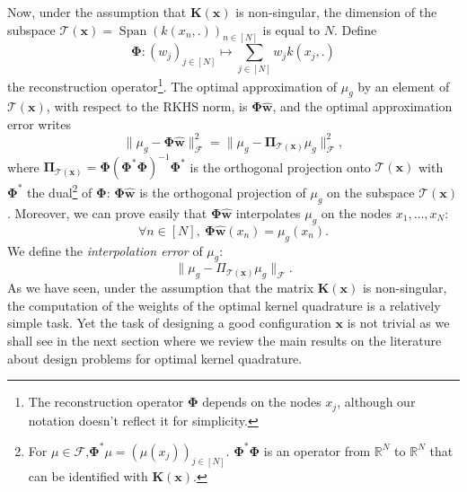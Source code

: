 \documentclass[twoside,11pt]{book}
\numberwithin{theorem}{chapter}
\numberwithin{definition}{chapter}
\numberwithin{proposition}{chapter}
\numberwithin{corollary}{chapter}
\numberwithin{example}{chapter}
\numberwithin{lemma}{chapter}
\DeclareMathOperator{\Span}{\mathrm{Span}}
\begin{document}
Now, under the assumption that $\bm{K}(\bm{x})$ is non-singular, the dimension of the subspace $\mathcal{T}(\bm{x}) = \Span (k(x_{n},.))_{n \in [N]}$ is equal to $N$. Define 
\begin{equation}
	\bm{\Phi}:(w_{j})_{j \in [N]} \mapsto \sum_{j \in [N]} w_{j} k(x_{j},.)
\end{equation}
 the reconstruction operator\footnote{The reconstruction operator $\bm{\Phi}$ depends on the nodes $x_{j}$, although our notation doesn't reflect it for simplicity.}. The optimal approximation of $\mu_{g}$ by an element of $\mathcal{T}(\bm{x})$, with respect to the RKHS norm, is $\bm{\Phi}\hat{\bm{w}}$, and the optimal approximation error writes
\begin{equation}
\|\mu_{g} - \bm{\Phi}\hat{\bm{w}}\|^{2}_{\mathcal{F}} =\|\mu_{g} - \bm{\Pi}_{\mathcal{T}(\bm{x})}\mu_{g}\|^{2}_{\mathcal{F}},\label{e:finalTool}
\end{equation}
where $\bm{\Pi}_{\mathcal{T}(\bm{x})} = \bm{\Phi}(\bm{\Phi}^{*}\bm{\Phi})^{-1}\bm{\Phi}^{*}$ is the orthogonal projection onto $\mathcal{T}(\bm{x})$ with $\bm{\Phi}^{*}$ the dual\footnote{For $\mu \in \mathcal{F}$,$\bm{\Phi}^{*}\mu = (\mu(x_{j}))_{j \in [N]}$. $\bm{\Phi}^{*}\bm{\Phi}$ is an operator from $\mathbb{R}^{N}$ to $\mathbb{R}^{N}$ that can be identified with $\bm{K}(\bm{x})$.} of $\bm{\Phi}$: $\bm{\Phi}\hat{\bm{w}}$ is the orthogonal projection of $\mu_{g}$ on the subspace $\mathcal{T}(\bm{x})$. Moreover, we can prove easily that $\bm{\Phi}\hat{\bm{w}}$ interpolates $\mu_{g}$ on the nodes $x_{1}, \dots, x_{N}$:
\begin{equation}
\forall n \in [N], \:\bm{\Phi}\hat{\bm{w}}(x_{n}) = \mu_{g}(x_{n}).
\end{equation}
We define the \emph{interpolation error} of $\mu_{g}$:
\begin{equation}
\|\mu_{g}- \Pi_{\mathcal{T}(\bm{x})}\mu_{g}\|_{\mathcal{F}}.
\end{equation}
As we have seen, under the assumption that the matrix $\bm{K}(\bm{x})$ is non-singular, the computation of the weights of the optimal kernel quadrature is a relatively simple task. Yet the task of designing a good configuration $\bm{x}$ is not trivial as we shall see in the next section where we review the main results on the literature about design problems for optimal kernel quadrature.
\end{document}
